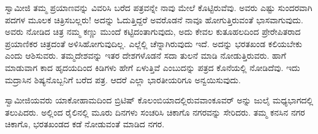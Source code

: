  ಸ್ವಾಮೀಜಿ ತಮ್ಮ ಪ್ರಯಾಣವನ್ನು ವಿವರಿಸಿ ಬರೆದ ಪತ್ರವನ್ನೇ ನಾವು ಮೇಲೆ ಕೊಟ್ಟಿರುವೆವು. ಅವರು ಎಷ್ಟು ಸುಂದರವಾಗಿ ಪದಗಳ ಮೂಲಕ ಚಿತ್ರಿಸಬಲ್ಲರು! ಅದನ್ನು ಓದುತ್ತಿದ್ದರೆ ಅವರೊಡನೆ ನಾವೂ ಹೋಗುತ್ತಿರುವಂತೆ ಭಾಸವಾಗುವುದು. ಅವರು ನೋಡಿದ ಚಿತ್ರ ನಮ್ಮ ಕಣ್ಣು ಮುಂದೆ ಕಟ್ಟಿದಂತಾಗುವುದು, ಅದು ಕೇವಲ ಕುತೂಹಲದಿಂದ ಪ್ರೇರೇಪಿತರಾದ ಪ್ರಯಾಣಿಕರ ಚಿತ್ರದಂತೆ ಅಳಿಸಿಹೋಗುವುದಿಲ್ಲ. ಎಲ್ಲೆಲ್ಲಿ ಚೆನ್ನಾಗಿರುವುದು ಇದೆ. ಅದನ್ನು ಭರತಖಂಡ ಕಲಿಯಬೇಕು ಎಂದು ಆಶಿಸುವರು. ತಮ್ಮ\break ದೇಶವನ್ನು ಇತರ ದೇಶಗಳೊಡನೆ ಸದಾ ತುಲನೆ ಮಾಡಿ ನೋಡುತ್ತಿರುವರು. ಹಾಗೆ ಮಾಡುವಾಗ ಕಾದ ಹೃದಯದಿಂದ ಕಿಡಿಗಳು ಹೇಗೆ ಏಳುತ್ತಿವೆ ಎಂಬುದನ್ನು ಪತ್ರದ ಕೊನೆಯಲ್ಲಿ ನೋಡಿದೆವು. ಇದು ಮದ್ರಾಸಿನ ಶಿಷ್ಯನೊಬ್ಬನಿಗೆ ಬರೆದ ಪತ್ರ. ಆದರೆ ಎಲ್ಲಾ ಭಾರತೀಯರಿಗೂ ಅನ್ವಯಿಸುವುದು. 

 ಸ್ವಾಮೀಜಿಯವರು ಯಾಕೋಹಾಮದಿಂದ ಬ್ರಿಟಿಷ್ ಕೊಲಂಬಿಯಾದಲ್ಲಿರುವ\break ವಾಂಕೂವರ್ ಅನ್ನು ಜುಲೈ ಮಧ್ಯಭಾಗದಲ್ಲಿ ತಲುಪಿದರು. ಅಲ್ಲಿಂದ ರೈಲಿನಲ್ಲಿ ಮೂರು ದಿನಗಳು ಸಂಚರಿಸಿ ಚಿಕಾಗೊ ನಗರವನ್ನು ಸೇರಿದರು. ತಮ್ಮ ಕನಸಿನ ನಗರ ಚಿಕಾಗೊ, ಭರತಖಂಡದ ಕಡೆ ನೋಡುವಂತೆ ಮಾಡಿದ ನಗರ. 


